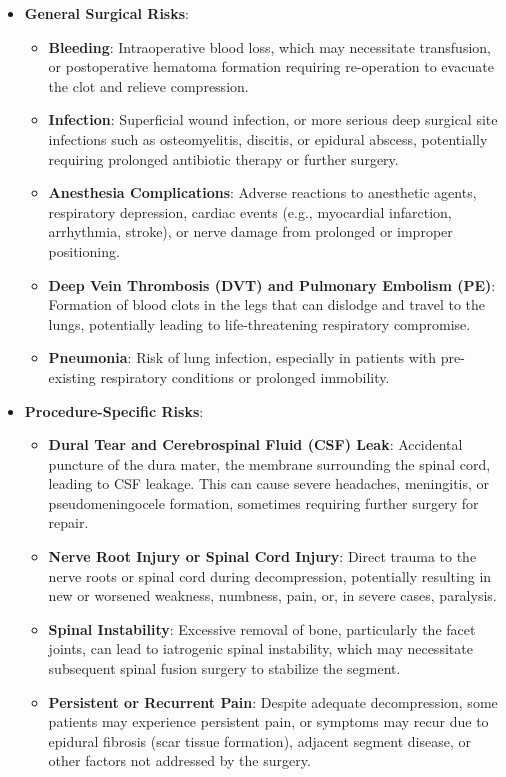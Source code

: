 \begin{itemize}
  \item \textbf{General Surgical Risks}:
    \begin{itemize}
      \item \textbf{Bleeding}: Intraoperative blood loss, which may necessitate transfusion, or postoperative hematoma formation requiring re-operation to evacuate the clot and relieve compression.
      \item \textbf{Infection}: Superficial wound infection, or more serious deep surgical site infections such as osteomyelitis, discitis, or epidural abscess, potentially requiring prolonged antibiotic therapy or further surgery.
      \item \textbf{Anesthesia Complications}: Adverse reactions to anesthetic agents, respiratory depression, cardiac events (e.g., myocardial infarction, arrhythmia, stroke), or nerve damage from prolonged or improper positioning.
      \item \textbf{Deep Vein Thrombosis (DVT) and Pulmonary Embolism (PE)}: Formation of blood clots in the legs that can dislodge and travel to the lungs, potentially leading to life-threatening respiratory compromise.
      \item \textbf{Pneumonia}: Risk of lung infection, especially in patients with pre-existing respiratory conditions or prolonged immobility.
    \end{itemize}
  \item \textbf{Procedure-Specific Risks}:
    \begin{itemize}
      \item \textbf{Dural Tear and Cerebrospinal Fluid (CSF) Leak}: Accidental puncture of the dura mater, the membrane surrounding the spinal cord, leading to CSF leakage. This can cause severe headaches, meningitis, or pseudomeningocele formation, sometimes requiring further surgery for repair.
      \item \textbf{Nerve Root Injury or Spinal Cord Injury}: Direct trauma to the nerve roots or spinal cord during decompression, potentially resulting in new or worsened weakness, numbness, pain, or, in severe cases, paralysis.
      \item \textbf{Spinal Instability}: Excessive removal of bone, particularly the facet joints, can lead to iatrogenic spinal instability, which may necessitate subsequent spinal fusion surgery to stabilize the segment.
      \item \textbf{Persistent or Recurrent Pain}: Despite adequate decompression, some patients may experience persistent pain, or symptoms may recur due to epidural fibrosis (scar tissue formation), adjacent segment disease, or other factors not addressed by the surgery.

\end{itemize}
\end{itemize}
